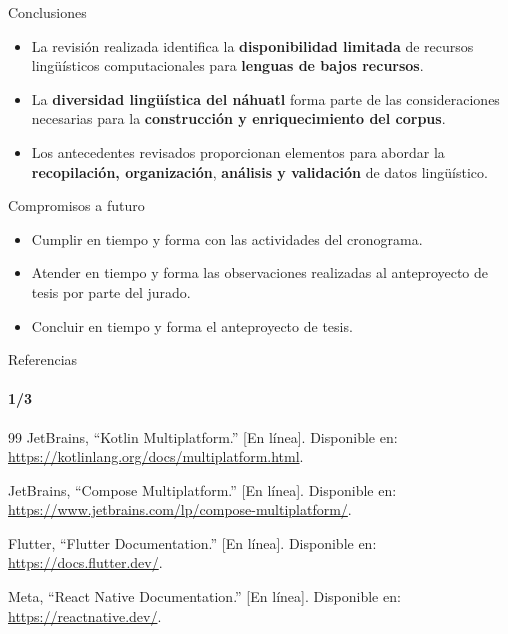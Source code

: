 \documentclass[aspectratio=169,10pt]{beamer}
\newcounter{bibliographycontinuation}
\begin{document}
\begin{frame}[label=conclusiones]{Conclusiones}
\begin{itemize}[<+->]
\setlength{\itemsep}{.55cm}
\item La revisión realizada identifica la \textbf{\color{Terracotta}disponibilidad limitada} de recursos lingüísticos computacionales para \textbf{\color{NahuaGreen}lenguas de bajos recursos}.
\item La \textbf{\color{NahuaGreen}diversidad lingüística del náhuatl} forma parte de las consideraciones necesarias para la \textbf{\color{Terracotta}construcción y enriquecimiento del corpus}.
\item Los antecedentes revisados proporcionan elementos para abordar la \textbf{\color{NahuaGreen}recopilación, organización}, \textbf{\color{Terracotta}análisis y validación} de datos lingüístico.
\end{itemize}
\end{frame}
\begin{frame}[label=compromisos]{Compromisos a futuro}
\begin{itemize}[<+->]
\setlength{\itemsep}{.55cm}
\item Cumplir en tiempo y forma con las actividades del cronograma.
\item Atender en tiempo y forma las observaciones realizadas al anteproyecto de tesis por parte del jurado.
\item Concluir en tiempo y forma el anteproyecto de tesis.
\end{itemize}
\end{frame}
\begin{frame}[t,label=referencias]{Referencias}
\framesubtitle{1/3}
\fontsize{9}{10.5}\selectfont
\begin{thebibliography}{99}
\setlength{\itemsep}{0.25cm}
JetBrains, ``Kotlin Multiplatform.'' [En línea]. Disponible en: \url{https://kotlinlang.org/docs/multiplatform.html}.

JetBrains, ``Compose Multiplatform.'' [En línea]. Disponible en: \url{https://www.jetbrains.com/lp/compose-multiplatform/}.

Flutter, ``Flutter Documentation.'' [En línea]. Disponible en: \url{https://docs.flutter.dev/}.

Meta, ``React Native Documentation.'' [En línea]. Disponible en: \url{https://reactnative.dev/}.

\setcounter{bibliographycontinuation}{\value{enumiv}}
\end{thebibliography}
\end{frame}
\end{document}
